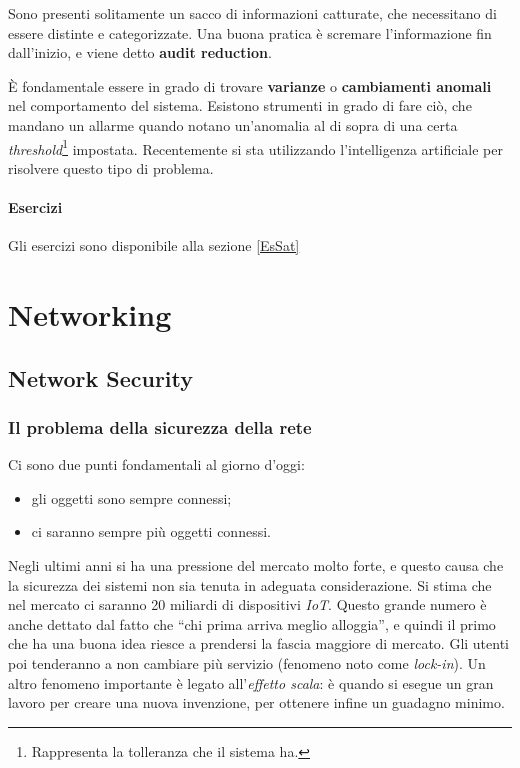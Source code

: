 Sono presenti solitamente un sacco di informazioni catturate, che necessitano
di essere distinte e categorizzate.
Una buona pratica è scremare l'informazione fin dall'inizio, e viene detto
\textbf{audit reduction}.

È fondamentale essere in grado di trovare \textbf{varianze} o \textbf{cambiamenti 
anomali} nel comportamento del sistema. Esistono strumenti in grado di fare
ciò, che mandano un allarme quando notano un'anomalia al di sopra di una certa
\textit{threshold}\footnote{Rappresenta la tolleranza che il sistema ha.}
impostata. Recentemente si sta utilizzando l'intelligenza artificiale per
risolvere questo tipo di problema.

\subsection{Esercizi}

Gli esercizi sono disponibile alla sezione \ref{EsSat}


\part{Networking}

\label{net}

\chapter{Network Security}

\section{Il problema della sicurezza della rete}

Ci sono due punti fondamentali al giorno d'oggi:

\begin{itemize}
\item gli oggetti sono sempre connessi;
\item ci saranno sempre più oggetti connessi.
\end{itemize}

Negli ultimi anni si ha una pressione del mercato molto forte, e questo causa
che la sicurezza dei sistemi non sia tenuta in adeguata considerazione. Si
stima che nel mercato ci saranno 20 miliardi di dispositivi \textit{IoT}.
Questo grande numero è anche dettato dal fatto che ``chi prima arriva meglio
alloggia'', e quindi il primo che ha una buona idea riesce a prendersi la
fascia maggiore di mercato. Gli utenti poi tenderanno a non cambiare più
servizio (fenomeno noto come \textit{lock-in}). Un altro fenomeno
importante è legato all'\textit{effetto scala}: è quando si esegue un gran
lavoro per creare una nuova invenzione, per ottenere infine un guadagno minimo.

